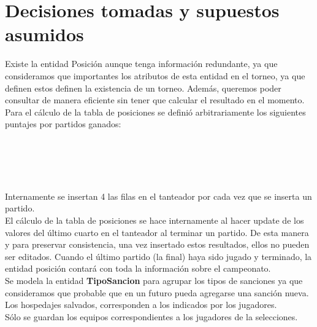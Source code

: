 \documentclass[11pt, a4paper, spanish]{article}
\begin{document}
{{{\newpage 
\section{Decisiones tomadas y supuestos asumidos}

    Existe la entidad Posici\'on aunque tenga informaci\'on redundante, ya que consideramos que importantes los atributos de esta entidad en el torneo, ya que definen estos definen la existencia de un torneo. Adem\'as, queremos poder consultar de  manera eficiente sin tener que calcular el resultado en el momento.\\

    Para el c\'alculo de la tabla de posiciones se defini\'o arbitrariamente los siguientes puntajes por partidos ganados:\\

\\
\\
\\
\\
\\

    Internamente se insertan 4 las filas en el tanteador por cada vez que se inserta un partido.\\

    El c\'alculo de la tabla de posiciones se hace internamente al hacer update de los valores del \'ultimo cuarto en el tanteador al terminar un partido. 
    De esta manera y para preservar consistencia, una vez insertado estos resultados, ellos no pueden ser editados. Cuando el \'ultimo partido (la final) haya sido jugado y terminado, la entidad posici\'on contar\'a con toda la informaci\'on sobre el campeonato.\\

    Se modela la entidad \textbf{TipoSancion} para agrupar los tipos de sanciones ya que consideramos que probable que en un futuro pueda agregarse una sanci\'on nueva.
    Los hospedajes salvados, corresponden a los indicados por los jugadores.\\

    S\'olo se guardan los equipos correspondientes a los jugadores de la selecciones.


}}}
\end{document}
